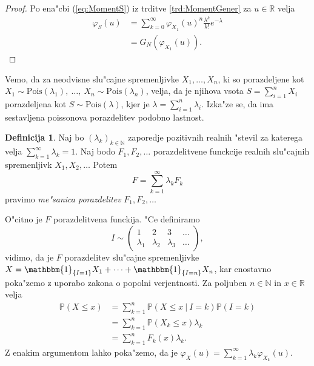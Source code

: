 \documentclass[12pt, a4paper, reqno]{amsart}
\theoremstyle{definition}
\newtheorem{definicija}{Definicija}[section]
\theoremstyle{plain}
\newcommand{\R}{\mathbb{R}}
\newcommand{\N}{\mathbb{N}}
\newcommand{\Prob}{\mathbb{P}}
\newcommand{\1}{\mathds{1}}
\newcommand{\Pois}[1]{\text{Pois}(#1)}
\begin{document}
    \begin{proof}
        Po ena"cbi (\ref{eq:MomentS}) iz trditve \ref{trd:MomentGener} za $u\in\R$ velja
        \begin{align*}
            \varphi_{S}(u) &= \sum_{k=0}^{\infty}
            \varphi_{X_1}(u)^n\frac{\lambda^k}{k!}e^{-\lambda} \\
            &= G_{N}\left(\varphi_{X_1}(u)\right).
        \end{align*}
    \end{proof}

    Vemo, da za neodvisne slu"cajne spremenljivke $X_1,  \dots, X_n$, ki so porazdeljene 
    kot $X_1\sim\Pois{\lambda_1}, \ \dots, \ X_n\sim\Pois{\lambda_n}$, 
    velja, da je njihova vsota $S = \sum_{i=1}^nX_i$ porazdeljena kot $S\sim\Pois{\lambda}$, kjer je
    $\lambda = \sum_{i=1}^n\lambda_i$. Izka"ze se, da ima sestavljena poissonova porazdelitev 
    podobno lastnost.

    \begin{definicija}
        Naj bo $(\lambda_k)_{k\in\N}$ zaporedje pozitivnih realnih "stevil za katerega velja 
        $\sum_{k=1}^\infty\lambda_k = 1$. Naj bodo $F_1, F_2, \dots$ porazdelitvene funckcije
        realnih slu"cajnih spremenljivk $X_1, X_2, \dots$ Potem 
        \begin{equation*}
            F = \sum_{k=1}^\infty\lambda_kF_k
        \end{equation*}
        pravimo \textit{me"sanica porazdelitev} $F_1, F_2, \dots$
    \end{definicija}
    \noindent
    O"citno je $F$ porazdelitvena funckija. "Ce definiramo 
    $$
    I \sim 
    \begin{pmatrix}
        1 & 2 & 3 & \dots \\
        \lambda_1 & \lambda_2 & \lambda_3 & \dots
    \end{pmatrix},
    $$
    vidimo, da je $F$ porazdelitev slu"cajne spremenljivke $X = \mathbbm{1}_{\{I = 1\}}X_1 + \cdots + \mathbbm{1}_{\{I = n\}}X_n$, 
    kar enostavno poka"zemo z uporabo zakona o popolni verjentnosti. Za poljuben $n\in\N$ in $x\in\R$ velja 
    \begin{align*}
        \Prob\left(X \leq x\right) 
        &= \sum_{k=1}^n\Prob\left(X \leq x \ \big| \ I = k\right)\Prob\left(I = k\right) \\
        &= \sum_{k=1}^n\Prob\left(X_k \leq x\right)\lambda_k \\
        &= \sum_{k=1}^nF_k(x)\lambda_k.
    \end{align*}
    Z enakim argumentom lahko poka"zemo, da je $\varphi_X(u) = \sum_{k=1}^\infty\lambda_k\varphi_{X_k}(u)$.
\end{document}
